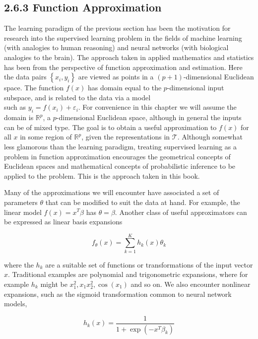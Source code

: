 \documentclass[10pt]{article}
\begin{document}
\subsection*{2.6.3 Function Approximation}
The learning paradigm of the previous section has been the motivation for research into the supervised learning problem in the fields of machine learning (with analogies to human reasoning) and neural networks (with biological analogies to the brain). The approach taken in applied mathematics and statistics has been from the perspective of function approximation and estimation. Here the data pairs $\left\{x_{i}, y_{i}\right\}$ are viewed as points in a $(p+1)$-dimensional Euclidean space. The function $f(x)$ has domain equal to the $p$-dimensional input subspace, and is related to the data via a model\\
such as $y_{i}=f\left(x_{i}\right)+\varepsilon_{i}$. For convenience in this chapter we will assume the domain is $\mathbb{R}^{p}$, a $p$-dimensional Euclidean space, although in general the inputs can be of mixed type. The goal is to obtain a useful approximation to $f(x)$ for all $x$ in some region of $\mathbb{R}^{p}$, given the representations in $\mathcal{T}$. Although somewhat less glamorous than the learning paradigm, treating supervised learning as a problem in function approximation encourages the geometrical concepts of Euclidean spaces and mathematical concepts of probabilistic inference to be applied to the problem. This is the approach taken in this book.

Many of the approximations we will encounter have associated a set of parameters $\theta$ that can be modified to suit the data at hand. For example, the linear model $f(x)=x^{T} \beta$ has $\theta=\beta$. Another class of useful approximators can be expressed as linear basis expansions


\begin{equation*}
f_{\theta}(x)=\sum_{k=1}^{K} h_{k}(x) \theta_{k} \tag{2.30}
\end{equation*}


where the $h_{k}$ are a suitable set of functions or transformations of the input vector $x$. Traditional examples are polynomial and trigonometric expansions, where for example $h_{k}$ might be $x_{1}^{2}, x_{1} x_{2}^{2}, \cos \left(x_{1}\right)$ and so on. We also encounter nonlinear expansions, such as the sigmoid transformation common to neural network models,


\begin{equation*}
h_{k}(x)=\frac{1}{1+\exp \left(-x^{T} \beta_{k}\right)} \tag{2.31}
\end{equation*}
\end{document}
